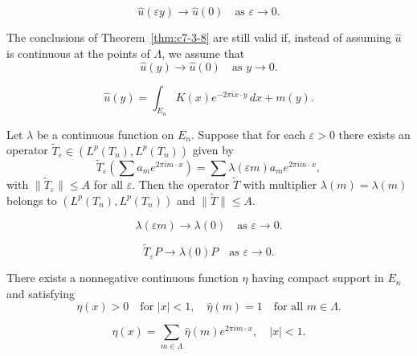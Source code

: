 \begin{equation}\label{eq:c7-3-15}
\hat{u}(\varepsilon y) \to \hat{u}(0) \quad \text{as } \varepsilon \to 0.
\end{equation}

\begin{corollary}\label{cor:c7-3-16}
The conclusions of Theorem~\ref{thm:c7-3-8} are still valid if, instead of assuming $\hat{u}$ is continuous at the points of $\Lambda$, we assume that
\[
\hat{u}(y) \to \hat{u}(0) \quad \text{as } y \to 0.
\]
\end{corollary}

\begin{equation}\label{eq:c7-3-17}
\hat{u}(y) = \int_{E_n} K(x) e^{-2\pi i x \cdot y}\,dx + m(y).
\end{equation}

\begin{theorem}\label{thm:c7-3-18}
Let $\lambda$ be a continuous function on $E_n$. Suppose that for each $\varepsilon > 0$ there exists an operator $\tilde{T}_\varepsilon \in (L^p(T_n), L^p(T_n))$ given by
\[
\tilde{T}_\varepsilon\left(\sum a_m e^{2\pi i m \cdot x}\right) = \sum \lambda(\varepsilon m) a_m e^{2\pi i m \cdot x},
\]
with $\|\tilde{T}_\varepsilon\| \leq A$ for all $\varepsilon$. Then the operator $\tilde{T}$ with multiplier $\lambda(m) = \lambda(m)$ belongs to $(L^p(T_n), L^p(T_n))$ and $\|\tilde{T}\| \leq A$.
\end{theorem}

\begin{equation}\label{eq:c7-3-19}
\lambda(\varepsilon m) \to \lambda(0) \quad \text{as } \varepsilon \to 0.
\end{equation}

\begin{equation}\label{eq:c7-3-20}
\tilde{T}_\varepsilon P \to \lambda(0) P \quad \text{as } \varepsilon \to 0.
\end{equation}

\begin{lemma}\label{lem:c7-3-21}
There exists a nonnegative continuous function $\eta$ having compact support in $E_n$ and satisfying
\[
\eta(x) > 0 \quad \text{for } |x| < 1, \quad \hat{\eta}(m) = 1 \quad \text{for all } m \in \Lambda.
\]
\end{lemma}

\begin{equation}\label{eq:c7-3-22}
\eta(x) = \sum_{m \in \Lambda} \hat{\eta}(m) e^{2\pi i m \cdot x}, \quad |x| < 1.
\end{equation}

